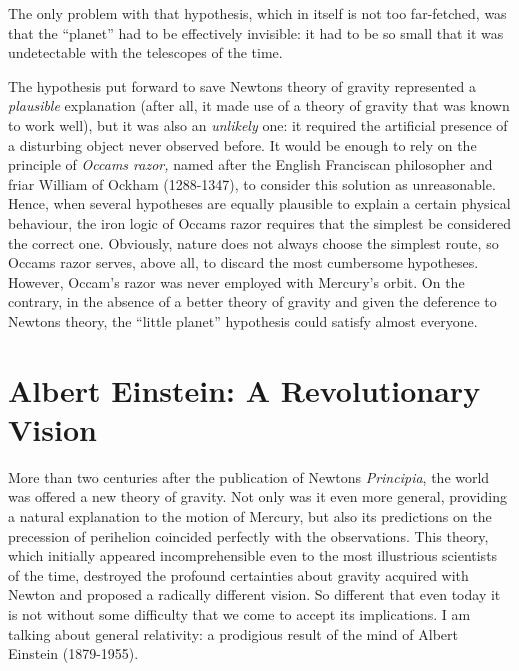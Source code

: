 The only problem with that hypothesis, which in itself is not too far-fetched, was that
the ``planet'' had to be effectively invisible: it had to be so small that it was
undetectable with the telescopes of the time.

The hypothesis put forward to save Newton\textquotesingle s theory of gravity
represented a \emph{plausible} explanation (after all, it made use of a theory of
gravity that was known to work well), but it was also an \emph{unlikely} one: it
required the artificial presence of a disturbing object never observed before. It would
be enough to rely on the principle of \emph{Occam\textquotesingle s razor,} named after
the English Franciscan philosopher and friar William of Ockham (1288-1347), to consider
this solution as unreasonable. Hence, when several hypotheses are equally plausible to
explain a certain physical behaviour, the iron logic of Occam\textquotesingle s razor
requires that the simplest be considered the correct one. Obviously, nature does not
always choose the simplest route, so Occam\textquotesingle s razor serves, above all, to
discard the most cumbersome hypotheses. However, Occam's razor was never employed with
Mercury's orbit. On the contrary, in the absence of a better theory of gravity and given
the deference to Newton\textquotesingle s theory, the ``little planet'' hypothesis could
satisfy almost everyone.

\section{Albert Einstein: A Revolutionary Vision}\label{sec:02-einstein}

More than two centuries after the publication of Newton\textquotesingle s
\emph{Principia}, the world was offered a new theory of gravity. Not only was it even
more general, providing a natural explanation to the motion of Mercury, but also its
predictions on the precession of perihelion coincided perfectly with
the observations. This theory, which initially appeared incomprehensible even to the
most illustrious scientists of the time, destroyed the profound certainties about
gravity acquired with Newton and proposed a radically different vision. So different
that even today it is not without some difficulty that we come to accept its
implications. I am talking about general relativity: a prodigious result of the mind of
Albert Einstein (1879-1955).

